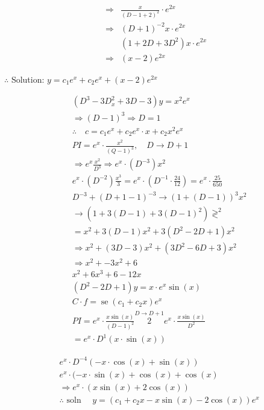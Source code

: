 \documentclass[12pt, a4paper]{article}
\begin{document}
$$
\begin{aligned}
\Rightarrow & \frac{x}{(D-1+2)^{2}} \cdot e^{2 x} \\
\Rightarrow & (D+1)^{-2} x \cdot e^{2 x} \\
& \left(1+2 D+3 D^{2}\right) x \cdot e^{2 x} \\
\Rightarrow & (x-2) e^{2 x}
\end{aligned}
$$

$\therefore$ Solution: $y=c_{1} e^{x}+c_{2} e^{x}+(x-2) e^{2 x}$


\begin{align*}
& \left(D^{3}-3 D_{x}^{2}+3 D-3\right) y=x^{2} e^{x} \\
& \Rightarrow(D-1)^{3} \Rightarrow D=1 \\
& \therefore \quad c=c_{1} e^{x}+c_{2} e^{x} \cdot x+c_{2} x^{2} e^{x} \\
& P I=e^{x} \cdot \frac{x^{2}}{(Q-1)^{3}}, \quad D \rightarrow D+1 \\
& \Rightarrow e^{x} \frac{x^{2}}{D^{3}} \Rightarrow e^{x} \cdot\left(D^{-3}\right) x^{2} \\
& e^{x} \cdot\left(D^{-2}\right) \frac{x^{3}}{3}=e^{x} \cdot\left(D^{-1} \cdot \frac{24}{12}\right)=e^{x} \cdot \frac{25}{650} \\
& D^{-3}+(D+1-1)^{-3} \rightarrow(1+(D-1))^{3} x^{2} \\
& \rightarrow\left(1+3(D-1)+3(D-1)^{2}\right) \gtrless^{2} \\
& =x^{2}+3(D-1) x^{2}+3\left(D^{2}-2 D+1\right) x^{2} \\
& \Rightarrow x^{2}+(3 D-3) x^{2}+\left(3 D^{2}-6 D+3\right) x^{2} \\
& \Rightarrow x^{2}+-3 x^{2}+6 \\
& x^{2}+6 x^{3}+6-12 x  \tag{1}\\
& \left(D^{2}-2 D+1\right) y=x \cdot e^{x} \sin (x) \\
& C \cdot f=\operatorname{se}\left(c_{1}+c_{2} x\right) e^{x} \\
& P I=e^{x} \cdot \frac{x \sin (x)}{(D-1)^{2}} \stackrel{D \rightarrow D+1}{2} e^{x} \cdot \frac{x \sin (x)}{D^{2}} \\
& =e^{x} \cdot D^{1}(x \cdot \sin (x))
\end{align*}


$$
\begin{aligned}
& e^{x} \cdot D^{-4}(-x \cdot \cos (x)+\sin (x)) \\
& e^{x} \cdot(-x \cdot \sin (x)+\cos (x)+\cos (x) \\
& \Rightarrow e^{x} \cdot(x \sin (x)+2 \cos (x)) \\
& \therefore \text { soln } \quad y=\left(c_{1}+c_{2} x-x \sin (x)-2 \cos (x)\right) e^{x}
\end{aligned}
$$
\end{document}

